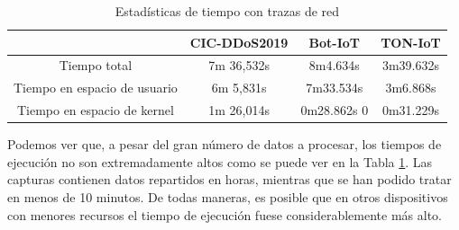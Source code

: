 \begin{table}[H]
    \begin{center}
        \begin{tabular}{|c | c c c |} 
            \hline
            & \textbf{CIC-DDoS2019} & \textbf{Bot-IoT} & \textbf{TON-IoT} \\
            \hline
            Tiempo total & 7m 36,532s & 8m4.634s & 3m39.632s \\
            Tiempo en espacio de usuario & 6m 5,831s  & 7m33.534s & 3m6.868s \\
            Tiempo en espacio de kernel  & 1m 26,014s & 0m28.862s 0 & 0m31.229s \\
            \hline
        \end{tabular}
    \end{center}
    \caption{Estadísticas de tiempo con trazas de red}
    \label{table:statstimeoffline}
\end{table}

Podemos ver que, a pesar del gran número de datos a procesar, los tiempos de ejecución no son extremadamente altos como se puede ver en la Tabla \ref{table:statstimeoffline}. Las capturas contienen datos repartidos en horas, mientras que se han podido tratar en menos de 10 minutos. De todas maneras, es posible que en otros dispositivos con menores recursos el tiempo de ejecución fuese considerablemente más alto.

\begin{table}[H]
    \begin{center}
    \end{center}
    \caption{Archivos generados con trazas de red}
    \label{table:generatedfilesoffline}
\end{table}

